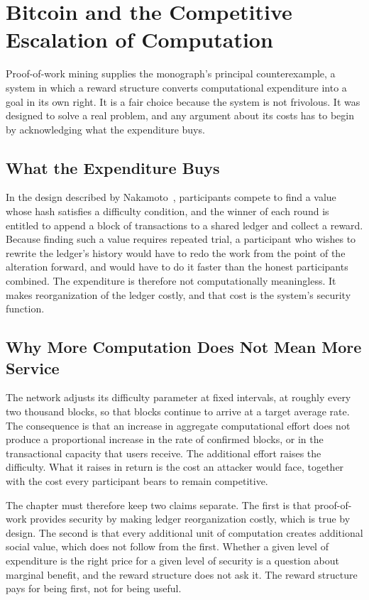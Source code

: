 \chapter[Bitcoin and Competitive Escalation]{Bitcoin and the Competitive Escalation of Computation}
\label{ch:bitcoin}

Proof-of-work mining supplies the monograph's principal counterexample, a system in which a reward structure converts computational expenditure into a goal in its own right. It is a fair choice because the system is not frivolous. It was designed to solve a real problem, and any argument about its costs has to begin by acknowledging what the expenditure buys.

\section{What the Expenditure Buys}

In the design described by Nakamoto~\cite{nakamoto2008}, participants compete to find a value whose hash satisfies a difficulty condition, and the winner of each round is entitled to append a block of transactions to a shared ledger and collect a reward. Because finding such a value requires repeated trial, a participant who wishes to rewrite the ledger's history would have to redo the work from the point of the alteration forward, and would have to do it faster than the honest participants combined. The expenditure is therefore not computationally meaningless. It makes reorganization of the ledger costly, and that cost is the system's security function.

\section{Why More Computation Does Not Mean More Service}

The network adjusts its difficulty parameter at fixed intervals, at roughly every two thousand blocks, so that blocks continue to arrive at a target average rate. The consequence is that an increase in aggregate computational effort does not produce a proportional increase in the rate of confirmed blocks, or in the transactional capacity that users receive. The additional effort raises the difficulty. What it raises in return is the cost an attacker would face, together with the cost every participant bears to remain competitive.

The chapter must therefore keep two claims separate. The first is that proof-of-work provides security by making ledger reorganization costly, which is true by design. The second is that every additional unit of computation creates additional social value, which does not follow from the first. Whether a given level of expenditure is the right price for a given level of security is a question about marginal benefit, and the reward structure does not ask it. The reward structure pays for being first, not for being useful.


